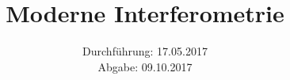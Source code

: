 

\subject{Versuch 64}
\title{Moderne Interferometrie}
\date{Durchführung: 17.05.2017 \\
      Abgabe: 09.10.2017}



\maketitle
\newpage






\nocite{V64}

\printbibliography


